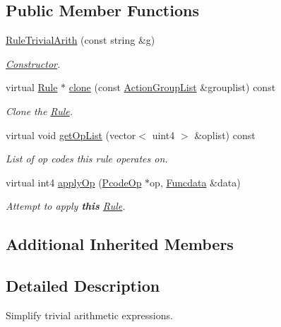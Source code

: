 \subsection*{Public Member Functions}
\begin{DoxyCompactItemize}
\item 
\mbox{\hyperlink{class_rule_trivial_arith_a4dbc9fead8af1a3f3960d11c3f9c06df}{Rule\+Trivial\+Arith}} (const string \&g)
\begin{DoxyCompactList}\small\item\em \mbox{\hyperlink{class_constructor}{Constructor}}. \end{DoxyCompactList}\item 
virtual \mbox{\hyperlink{class_rule}{Rule}} $\ast$ \mbox{\hyperlink{class_rule_trivial_arith_a2c92af6c8447390481239efa67e5ece7}{clone}} (const \mbox{\hyperlink{class_action_group_list}{Action\+Group\+List}} \&grouplist) const
\begin{DoxyCompactList}\small\item\em Clone the \mbox{\hyperlink{class_rule}{Rule}}. \end{DoxyCompactList}\item 
virtual void \mbox{\hyperlink{class_rule_trivial_arith_a5ea9eaec045f952aac8c2af5198bdda0}{get\+Op\+List}} (vector$<$ uint4 $>$ \&oplist) const
\begin{DoxyCompactList}\small\item\em List of op codes this rule operates on. \end{DoxyCompactList}\item 
virtual int4 \mbox{\hyperlink{class_rule_trivial_arith_a692632ff3e5fa2bad3ba12b6ff2005be}{apply\+Op}} (\mbox{\hyperlink{class_pcode_op}{Pcode\+Op}} $\ast$op, \mbox{\hyperlink{class_funcdata}{Funcdata}} \&data)
\begin{DoxyCompactList}\small\item\em Attempt to apply {\bfseries{this}} \mbox{\hyperlink{class_rule}{Rule}}. \end{DoxyCompactList}\end{DoxyCompactItemize}
\subsection*{Additional Inherited Members}


\subsection{Detailed Description}
Simplify trivial arithmetic expressions. 

